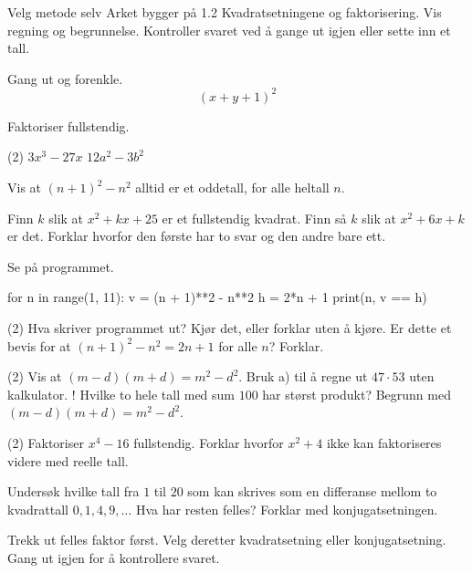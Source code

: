 
\begin{infoboks}{Velg metode selv}
Arket bygger på 1.2 Kvadratsetningene og faktorisering. Vis regning og begrunnelse.
Kontroller svaret ved å gange ut igjen eller sette inn et tall.
\end{infoboks}


Gang ut og forenkle.
\[ (x+y+1)^2 \]

Faktoriser fullstendig.
\begin{tasks}(2)
  \task $3x^3 - 27x$
  \task $12a^2 - 3b^2$
\end{tasks}


Vis at $(n+1)^2 - n^2$ alltid er et oddetall, for alle heltall $n$.

Finn $k$ slik at $x^2 + kx + 25$ er et fullstendig kvadrat.
Finn så $k$ slik at $x^2 + 6x + k$ er det.
Forklar hvorfor den første har to svar og den andre bare ett.

Se på programmet.
\begin{kode}
for n in range(1, 11):
    v = (n + 1)**2 - n**2
    h = 2*n + 1
    print(n, v == h)
\end{kode}
\begin{tasks}(2)
  \task Hva skriver programmet ut? Kjør det, eller forklar uten å kjøre.
  \task Er dette et bevis for at $(n+1)^2 - n^2 = 2n + 1$ for alle $n$? Forklar.
\end{tasks}

\begin{tasks}(2)
  \task Vis at $(m-d)(m+d) = m^2 - d^2$.
  \task Bruk a) til å regne ut $47 \cdot 53$ uten kalkulator.
  \task! Hvilke to hele tall med sum $100$ har størst produkt? Begrunn med $(m-d)(m+d) = m^2 - d^2$.
\end{tasks}

\begin{tasks}(2)
  \task Faktoriser $x^4 - 16$ fullstendig.
  \task Forklar hvorfor $x^2 + 4$ ikke kan faktoriseres videre med reelle tall.
\end{tasks}

Undersøk hvilke tall fra $1$ til $20$ som kan skrives som en differanse mellom to kvadrattall $0, 1, 4, 9, \ldots$
Hva har resten felles? Forklar med konjugatsetningen.

\begin{oppsummering}
Trekk ut felles faktor først. Velg deretter kvadratsetning eller konjugatsetning.
Gang ut igjen for å kontrollere svaret.
\end{oppsummering}
